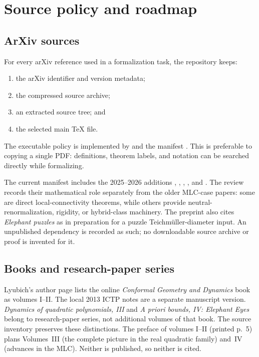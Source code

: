 \chapter{Source policy and roadmap}

\section{ArXiv sources}

For every arXiv reference used in a formalization task, the repository keeps:
\begin{enumerate}
\item the arXiv identifier and version metadata;
\item the compressed source archive;
\item an extracted source tree; and
\item the selected main \TeX{} file.
\end{enumerate}
The executable policy is implemented by
 and the manifest
.  This is preferable to copying a single PDF:
definitions, theorem labels, and notation can be searched directly while
formalizing.

The current manifest includes the 2025--2026 additions
, , ,
, and .  The review records their
mathematical role separately from the older MLC-case papers: some are direct
local-connectivity theorems, while others provide neutral-renormalization,
rigidity, or hybrid-class machinery.
The preprint  also cites \emph{Elephant puzzles}
as in preparation for a puzzle Teichmüller-diameter input.
An unpublished dependency is recorded as such; no downloadable
source archive or proof is invented for it.

\section{Books and research-paper series}

Lyubich's author page lists the online \emph{Conformal Geometry and
Dynamics} book as volumes I--II.  The local 2013 ICTP notes are a
separate manuscript version.  \emph{Dynamics of quadratic
polynomials, III} and \emph{A priori bounds, IV: Elephant Eyes}
belong to research-paper series, not additional volumes of that book.
The source inventory preserves these distinctions.  The preface of volumes I--II (printed p.~5) plans
Volumes~III (the complete picture in the real quadratic family) and~IV (advances in the MLC).  Neither is
published, so neither is cited.

